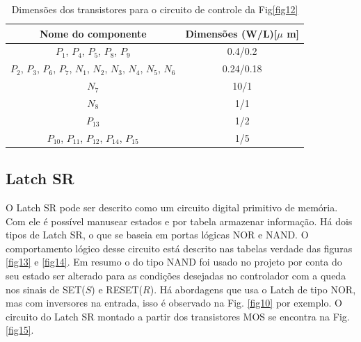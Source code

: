 \begin{table}[htb]
\centering
\begin{tabular}{c|c}
\hline 
\hline 
\textbf{Nome do componente} & \textbf{Dimensões (W/L)[$\mu$ m]} \\ 
\hline 
\hline 
$P_{1}$, $P_{4}$, $P_{5}$, $P_{8}$, $P_{9}$ & 0.4/0.2 \\ \hline
$P_{2}$, $P_{3}$, $P_{6}$, $P_{7}$, $N_{1}$, $N_{2}$, $N_{3}$, $N_{4}$, $N_{5}$, $N_{6}$  & 0.24/0.18 \\ \hline
$N_7$ & 10/1 \\ \hline
$N_{8}$ & 1/1 \\ \hline

$P_13$ & 1/2 \\ \hline 
$P_{10}$, $P_{11}$, $P_{12}$, $P_{14}$, $P_{15}$  & 1/5 \\ 
\hline 
\end{tabular} 
\caption{Dimensões dos transistores para o circuito de controle da Fig\ref{fig12}}
\label{tab:control}
\end{table}

\subsection{Latch SR}

O Latch SR pode ser descrito como um circuito digital primitivo de memória. Com ele é possível manusear estados e por tabela armazenar informação. Há dois tipos de Latch SR, o que se baseia em portas lógicas NOR e NAND.
O comportamento lógico desse circuito está descrito nas tabelas verdade das figuras \ref{fig13} e \ref{fig14}. Em resumo o do tipo NAND foi usado no projeto por conta do seu estado ser alterado para as condições desejadas no controlador com a queda nos sinais de SET($S$) e RESET($R$). Há abordagens que usa o Latch de tipo NOR, mas com inversores na entrada, isso é observado na Fig. \ref{fig10} por exemplo. 
O circuito do Latch SR montado a partir dos transistores MOS se encontra na Fig. \ref{fig15}. 

